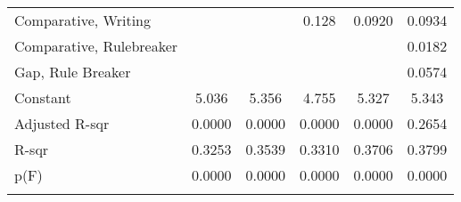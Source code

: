 {\begin{center}
{\begin{longtable}{l*{5}{c}}
Comparative, Writing &                     &                     &       0.128         &      0.0920         &      0.0934         \\
\addlinespace
Comparative, Rulebreaker &                     &                     &                     &                     &      0.0182         \\
\addlinespace
Gap, Rule Breaker        &                     &                     &                     &                     &      0.0574         \\
\addlinespace
Constant                 &       5.036\sym{***}&       5.356\sym{***}&       4.755\sym{***}&       5.327\sym{***}&       5.343\sym{***}\\
\midrule
Adjusted R-sqr           &      0.0000         &      0.0000         &      0.0000         &      0.0000         &      0.2654         \\
R-sqr                    &      0.3253         &      0.3539         &      0.3310         &      0.3706         &      0.3799         \\
p(F)                     &      0.0000         &      0.0000         &      0.0000         &      0.0000         &      0.0000         \\
\hline
\addlinespace
\multicolumn{6}{l}{\footnotesize \sym{*} \(p<0.10\), \sym{**} \(p<0.05\), \sym{***} \(p<.01\)}\\

\end{longtable}
}
\end{center}
}

